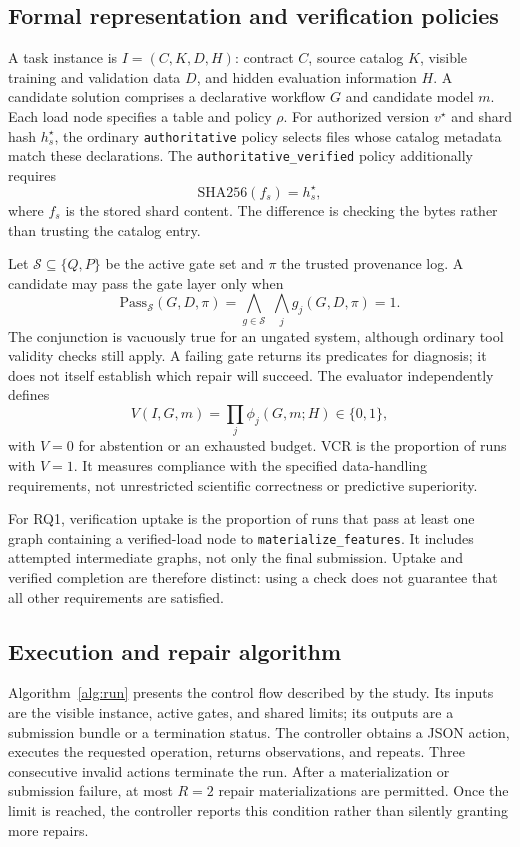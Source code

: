 \documentclass[conference]{IEEEtran}
\newcommand{\code}[1]{\texttt{#1}}
\begin{document}
\subsection{Formal representation and verification policies}
A task instance is $I=(C,K,D,H)$: contract $C$, source catalog $K$, visible training and validation data $D$, and hidden evaluation information $H$. A candidate solution comprises a declarative workflow $G$ and candidate model $m$. Each load node specifies a table and policy $\rho$. For authorized version $v^\star$ and shard hash $h_s^\star$, the ordinary \code{authoritative} policy selects files whose catalog metadata match these declarations. The \code{authoritative\_verified} policy additionally requires
\begin{equation}
\mathrm{SHA256}(f_s)=h_s^\star,
\label{eq:hash}
\end{equation}
where $f_s$ is the stored shard content. The difference is checking the bytes rather than trusting the catalog entry.

Let $\mathcal{S}\subseteq\{Q,P\}$ be the active gate set and $\pi$ the trusted provenance log. A candidate may pass the gate layer only when
\begin{equation}
\mathrm{Pass}_{\mathcal{S}}(G,D,\pi)=
\bigwedge_{g\in\mathcal{S}}\;\bigwedge_j g_j(G,D,\pi)=1.
\label{eq:gate}
\end{equation}
The conjunction is vacuously true for an ungated system, although ordinary tool validity checks still apply. A failing gate returns its predicates for diagnosis; it does not itself establish which repair will succeed. The evaluator independently defines
\begin{equation}
V(I,G,m)=\prod_j\phi_j(G,m;H)\in\{0,1\},
\label{eq:v}
\end{equation}
with $V=0$ for abstention or an exhausted budget. VCR is the proportion of runs with $V=1$. It measures compliance with the specified data-handling requirements, not unrestricted scientific correctness or predictive superiority.

For RQ1, verification uptake is the proportion of runs that pass at least one graph containing a verified-load node to \code{materialize\_features}. It includes attempted intermediate graphs, not only the final submission. Uptake and verified completion are therefore distinct: using a check does not guarantee that all other requirements are satisfied.

\subsection{Execution and repair algorithm}
Algorithm~\ref{alg:run} presents the control flow described by the study. Its inputs are the visible instance, active gates, and shared limits; its outputs are a submission bundle or a termination status. The controller obtains a JSON action, executes the requested operation, returns observations, and repeats. Three consecutive invalid actions terminate the run. After a materialization or submission failure, at most $R=2$ repair materializations are permitted. Once the limit is reached, the controller reports this condition rather than silently granting more repairs.
\end{document}
